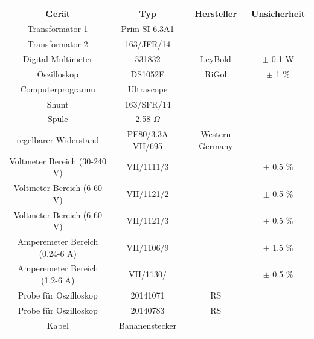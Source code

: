 \documentclass[11pt,ngerman]{scrartcl}
\begin{document}
\begin{center}
	\begin{tabular}{|c|c|c|c|} \hline
		\textbf{Gerät}                 & \textbf{Typ}       & \textbf{Hersteller} & \textbf{Unsicherheit} \\ \hline

		Transformator 1                & Prim SI 6.3A1      &                     &                       \\ \hline
		Transformator 2                & 163/JFR/14         &                     &                       \\ \hline
		Digital Multimeter             & 531832             & LeyBold             & $\pm$ 0.1 W           \\ \hline
		Oszilloskop                    & DS1052E            & RiGol               & $\pm$ 1 \%            \\ \hline
		Computerprogramm               & Ultrascope         &                     &                       \\ \hline
		Shunt                          & 163/SFR/14         &                     &                       \\ \hline
		Spule                          & 2.58 $\Omega$      &                     &                       \\ \hline
		regelbarer Widerstand          & PF80/3.3A  VII/695 & Western Germany     &                       \\ \hline
		Voltmeter Bereich (30-240 V)   & VII/1111/3         &                     & $\pm$ 0.5 \%          \\ \hline
		Voltmeter Bereich (6-60 V)     & VII/1121/2         &                     & $\pm$ 0.5 \%          \\ \hline
		Voltmeter Bereich (6-60 V)     & VII/1121/3         &                     & $\pm$ 0.5 \%          \\ \hline
		Amperemeter Bereich (0.24-6 A) & VII/1106/9         &                     & $\pm$ 1.5 \%          \\ \hline
		Amperemeter Bereich (1.2-6 A)  & VII/1130/          &                     & $\pm$ 0.5 \%          \\ \hline
		Probe für Oszilloskop          & 20141071           & RS                  &                       \\ \hline
		Probe für Oszilloskop          & 20140783           & RS                  &                       \\ \hline
		Kabel                          & Bananenstecker     &                     &                       \\ \hline
	\end{tabular}
	\label{tab:material}
\end{center}
\end{document}
